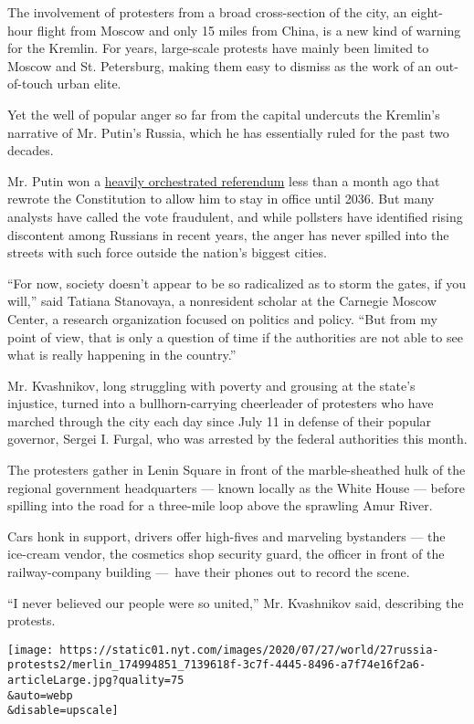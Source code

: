 The involvement of protesters from a broad cross-section of the city, an
eight-hour flight from Moscow and only 15 miles from China, is a new
kind of warning for the Kremlin. For years, large-scale protests have
mainly been limited to Moscow and St. Petersburg, making them easy to
dismiss as the work of an out-of-touch urban elite.

Yet the well of popular anger so far from the capital undercuts the
Kremlin's narrative of Mr. Putin's Russia, which he has essentially
ruled for the past two decades.

Mr. Putin won a
\href{https://www.nytimes.com/2020/07/01/world/europe/putin-referendum-vote-russia.html}{heavily
orchestrated referendum} less than a month ago that rewrote the
Constitution to allow him to stay in office until 2036. But many
analysts have called the vote fraudulent, and while pollsters have
identified rising discontent among Russians in recent years, the anger
has never spilled into the streets with such force outside the nation's
biggest cities.

``For now, society doesn't appear to be so radicalized as to storm the
gates, if you will,'' said Tatiana Stanovaya, a nonresident scholar at
the Carnegie Moscow Center, a research organization focused on politics
and policy. ``But from my point of view, that is only a question of time
if the authorities are not able to see what is really happening in the
country.''

Mr. Kvashnikov, long struggling with poverty and grousing at the state's
injustice, turned into a bullhorn-carrying cheerleader of protesters who
have marched through the city each day since July 11 in defense of their
popular governor, Sergei I. Furgal, who was arrested by the federal
authorities this month.

The protesters gather in Lenin Square in front of the marble-sheathed
hulk of the regional government headquarters --- known locally as the
White House --- before spilling into the road for a three-mile loop
above the sprawling Amur River.

Cars honk in support, drivers offer high-fives and marveling bystanders
--- the ice-cream vendor, the cosmetics shop security guard, the officer
in front of the railway-company building ---~have their phones out to
record the scene.

``I never believed our people were so united,'' Mr. Kvashnikov said,
describing the protests.

\texttt{[image: https://static01.nyt.com/images/2020/07/27/world/27russia-protests2/merlin\_174994851\_7139618f-3c7f-4445-8496-a7f74e16f2a6-articleLarge.jpg?quality=75\\\&auto=webp\\\&disable=upscale]}


